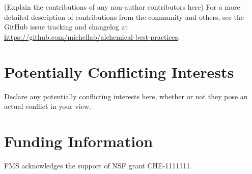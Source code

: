 \documentclass[9pt,bestpractices]{livecoms}
\newcommand{\githubrepository}{\url{https://github.com/michellab/alchemical-best-practices}}  %
\begin{document}
(Explain the contributions of any non-author contributors here)
For a more detailed description of contributions from the community and others, see the GitHub issue tracking and changelog at \githubrepository.

\section*{Potentially Conflicting Interests}

Declare any potentially conflicting interests here, whether or not they pose an actual conflict in your view.

\section*{Funding Information}
FMS acknowledges the support of NSF grant CHE-1111111.




\end{document}
